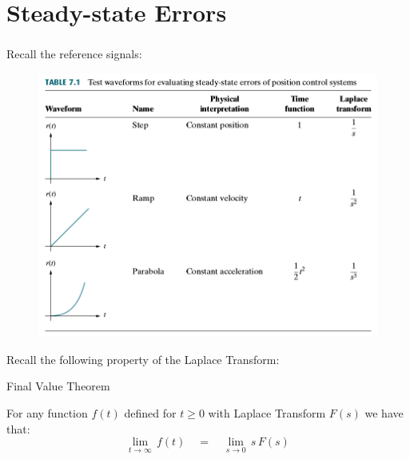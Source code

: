\documentclass[ 10pt, xcolor = dvipsnames]{beamer}
\newcommand{\theoremblock}[2]{
\begin{center}
\begin{minipage}{0.9\columnwidth}
\begin{block}{#1}
#2
\end{block}
\end{minipage}
\end{center}
}
\begin{document}
\section{Steady-state Errors}

\begin{frame}[allowframebreaks]
\frametitle{\insertsection}

Recall the reference signals: 
\begin{figure}
\centering
\includegraphics[width=0.72\columnwidth]{figures/Nise_Table-7-1.jpg}
\end{figure}
\framebreak

Recall the following property of the Laplace Transform: 

\theoremblock{Final Value Theorem}{
For any function $f(t)$ defined for $t \geq 0$ with Laplace Transform $F(s)$ \linebreak we have that: 
\[
\lim_{ t \rightarrow \infty } \, f(t) \quad = \quad
\lim_{ s \rightarrow 0 } \, s \, F(s)
\]
\halfskip
}

\end{frame}
\end{document}
